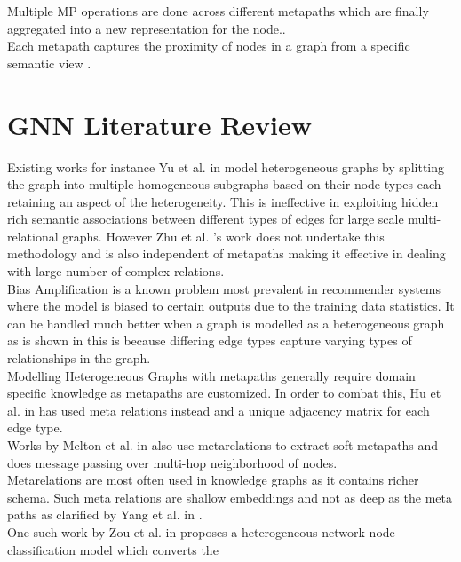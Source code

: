 \documentclass{report} %
\begin{document}
Multiple \ac{MP} operations are done across different metapaths which are finally aggregated into a new representation for the node.\cite{ML HGNN-2023}.\\
Each metapath captures the proximity of nodes in a graph from a specific semantic view \cite{HGNN-2020}.

\section{\ac{GNN} Literature Review}\label{sec:GNN Literature Review}

Existing works for instance Yu et al. in \cite{PR-HGNN-2024} model heterogeneous graphs by splitting the graph into multiple 
homogeneous subgraphs based on their node types each retaining an aspect of the heterogeneity.
This is ineffective in exploiting hidden rich semantic associations between different types of edges for large scale multi-relational graphs.
However Zhu et al. \cite{RSHGNN-2019}'s work does not undertake this methodology and is also independent of metapaths making it effective 
in dealing with large number of complex relations.\\
Bias Amplification is a known problem most prevalent in recommender systems where the model is biased to certain outputs due to the training data statistics.
It can be handled much better when a graph is modelled as a heterogeneous graph as is shown in \cite{EV HGNN-2023} this is because differing 
edge types capture varying types of relationships in the graph. \\
Modelling Heterogeneous Graphs with metapaths generally require domain specific knowledge as metapaths are customized. 
In order to combat this, Hu et al. in \cite{HGT-2022} has used meta relations instead and a unique adjacency matrix for each edge type.\\
Works by Melton et al. in \cite{MHGNN-2023} also use metarelations to extract soft metapaths and does message passing over multi-hop neighborhood of nodes. \\
Metarelations are most often used in knowledge graphs as it contains richer schema. 
Such meta relations are shallow embeddings and not as deep as the meta paths as clarified by Yang et al. in \cite{HGNN-2020}. \\
One such work by Zou et al. in \cite{HNNC-2023} proposes a heterogeneous network node classification model which converts the 
\end{document}
